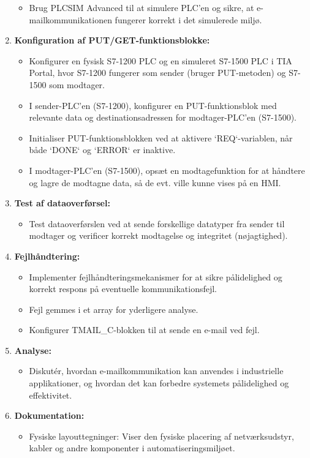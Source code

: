 \begin{enumerate}
\begin{itemize}
		\item Brug PLCSIM Advanced til at simulere PLC'en og sikre, at e-mailkommunikationen fungerer korrekt i det simulerede miljø.
	\end{itemize}
	\item \textbf{Konfiguration af PUT/GET-funktionsblokke:}
	\begin{itemize}
		\item Konfigurer en fysisk S7-1200 PLC og en simuleret S7-1500 PLC i TIA Portal, hvor S7-1200 fungerer som sender (bruger PUT-metoden) og S7-1500 som modtager.
		\item I sender-PLC'en (S7-1200), konfigurer en PUT-funktionsblok med relevante data og destinationsadressen for modtager-PLC'en (S7-1500).
		\item Initialiser PUT-funktionsblokken ved at aktivere `REQ`-variablen, når både `DONE` og `ERROR` er inaktive.
		\item I modtager-PLC'en (S7-1500), opsæt en modtagefunktion for at håndtere og lagre de modtagne data, så de evt. ville kunne vises på en HMI.
	\end{itemize}
	\item \textbf{Test af dataoverførsel:}
	\begin{itemize}
		\item Test dataoverførslen ved at sende forskellige datatyper fra sender til modtager og verificer korrekt modtagelse og integritet (nøjagtighed).
	\end{itemize}
	\item \textbf{Fejlhåndtering:}
	\begin{itemize}
		\item Implementer fejlhåndteringsmekanismer for at sikre pålidelighed og korrekt respons på eventuelle kommunikationsfejl.
		\item Fejl gemmes i et array for yderligere analyse.
		\item Konfigurer TMAIL\_C-blokken til at sende en e-mail ved fejl.
	\end{itemize}
	\item \textbf{Analyse:}
	\begin{itemize}
		\item Diskutér, hvordan e-mailkommunikation kan anvendes i industrielle applikationer, og hvordan det kan forbedre systemets pålidelighed og effektivitet.
	\end{itemize}
	\item \textbf{Dokumentation:}
	\begin{itemize}
		\item Fysiske layouttegninger: Viser den fysiske placering af netværksudstyr, kabler og andre komponenter i automatiseringsmiljøet.

\end{itemize}
\end{enumerate}
